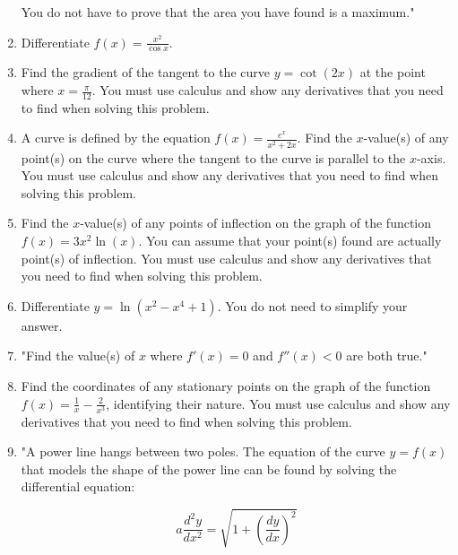 \documentclass{article}
\begin{document}
\begin{enumerate}
You do not have to prove that the area you have found is a maximum."
\vspace{3cm}
\item Differentiate \( f(x) = \frac{x^2}{\cos x} \).
\vspace{3cm}
\item Find the gradient of the tangent to the curve \( y = \cot(2x) \) at the point where \( x = \frac{\pi}{12} \). You must use calculus and show any derivatives that you need to find when solving this problem.
\vspace{3cm}
\item A curve is defined by the equation \( f(x) = \frac{e^x}{x^2 + 2x} \). Find the \( x \)-value(s) of any point(s) on the curve where the tangent to the curve is parallel to the \( x \)-axis. You must use calculus and show any derivatives that you need to find when solving this problem.
\vspace{3cm}
\item Find the \( x \)-value(s) of any points of inflection on the graph of the function \( f(x) = 3x^2 \ln(x) \). You can assume that your point(s) found are actually point(s) of inflection. You must use calculus and show any derivatives that you need to find when solving this problem.
\vspace{3cm}
\item Differentiate \( y = \ln(x^2 - x^4 + 1) \). You do not need to simplify your answer.
\vspace{3cm}
\item "Find the value(s) of \( x \) where \( f'(x) = 0 \) and \( f''(x) < 0 \) are both true."
\vspace{3cm}
\item Find the coordinates of any stationary points on the graph of the function \( f(x) = \frac{1}{x} - \frac{2}{x^3} \), identifying their nature. You must use calculus and show any derivatives that you need to find when solving this problem.
\vspace{3cm}
\item "A power line hangs between two poles. The equation of the curve \( y = f(x) \) that models the shape of the power line can be found by solving the differential equation:

\[ a \frac{d^2 y}{dx^2} = \sqrt{1 + \left( \frac{dy}{dx} \right)^2} \]


\end{enumerate}
\end{document}
